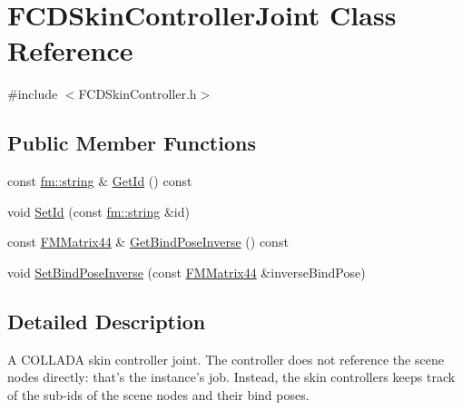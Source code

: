 \hypertarget{classFCDSkinControllerJoint}{
\section{FCDSkinControllerJoint Class Reference}
\label{classFCDSkinControllerJoint}
}


{\ttfamily \#include $<$FCDSkinController.h$>$}

\subsection*{Public Member Functions}
\begin{DoxyCompactItemize}
\item 
const \hyperlink{classfm_1_1stringT}{fm::string} \& \hyperlink{classFCDSkinControllerJoint_aafa83feff34c690754513f4d947ca37a}{GetId} () const 
\item 
void \hyperlink{classFCDSkinControllerJoint_a456dc23cbc28a733e23d83b79a73e97d}{SetId} (const \hyperlink{classfm_1_1stringT}{fm::string} \&id)
\item 
const \hyperlink{classFMMatrix44}{FMMatrix44} \& \hyperlink{classFCDSkinControllerJoint_a2bb1d864ad62ed7dab4aafa4aadfb4cf}{GetBindPoseInverse} () const 
\item 
void \hyperlink{classFCDSkinControllerJoint_a0d3c78883effabc8cec5feb778dc6173}{SetBindPoseInverse} (const \hyperlink{classFMMatrix44}{FMMatrix44} \&inverseBindPose)
\end{DoxyCompactItemize}


\subsection{Detailed Description}
A COLLADA skin controller joint. The controller does not reference the scene nodes directly: that's the instance's job. Instead, the skin controllers keeps track of the sub-\/ids of the scene nodes and their bind poses. 

